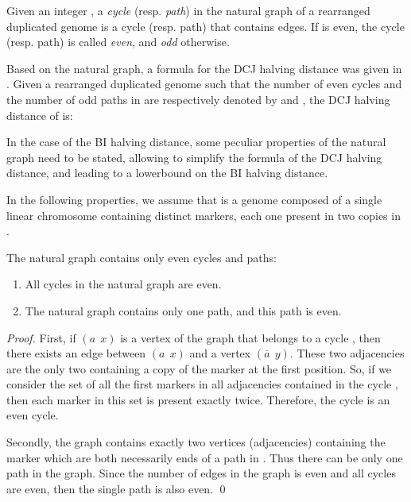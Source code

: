 \documentclass{llncs}
\newcommand{\fst}[1]{ \ensuremath{#1} }
\newcommand{\snd}[1]{ \ensuremath{\overline{#1}} }
\newcommand\aff[2]{\ensuremath{(\fst{#1}~~\fst{#2})}}
\newcommand\asf[2]{\ensuremath{(\snd{#1}~~\fst{#2})}}
\begin{document}
\begin{definition}
    Given an integer , a \emph{cycle} (resp. \emph{path}) in the 
    natural graph of a rearranged duplicated genome is a cycle (resp. path) 
    that contains  edges. If  is even, the cycle (resp. path) is called 
   \emph{even}, and \emph{odd} otherwise.
\end{definition}

\def\EC{\ensuremath{\mbox{EC}}}
\def\OP{\ensuremath{\mbox{OP}}}

Based on the natural graph, a formula for the DCJ halving distance was given in \cite{Mixtacki08}. Given a rearranged duplicated genome  such that the number of even cycles and the number of odd paths in 
are respectively denoted by   and , the  DCJ halving distance of  is:
    

In the case of the BI halving distance, some peculiar properties of the natural graph need to be stated, allowing to simplify the formula of the DCJ halving distance, and leading to a lowerbound on the BI halving distance.


In the following properties, we assume that  is a genome composed of a 
single linear chromosome containing  distinct markers, each one present 
in two copies in . 


\begin{property}
The natural graph  contains only even cycles and paths: 
\label{prop:EC}
\label{prop:1EP}
\begin{enumerate}
\item All cycles in the natural graph  are even.
\item The natural graph  contains only one path, and this path is even.
\end{enumerate}
\end{property}

\begin{proof}
    First, if \aff{a}{x} is a vertex of the
    graph that belongs to a cycle , then there exists an edge between
    \aff{a}{x} and a vertex \asf{a}{y}. These two
    adjacencies are the only two containing a copy of the marker  at the
    first position. So, if we consider the set of all the first markers in
    all adjacencies contained in the cycle , then each marker in this set is
    present exactly twice. Therefore, the cycle  is an even cycle.
  
    Secondly, the graph contains exactly two vertices (adjacencies) containing the
    marker  which are both necessarily ends of a path in . Thus
   there can be only one path in the graph. Since the number of edges in the 
   graph is even and all cycles are even, then the single path is also even. \qed
\end{proof}
\end{document}
